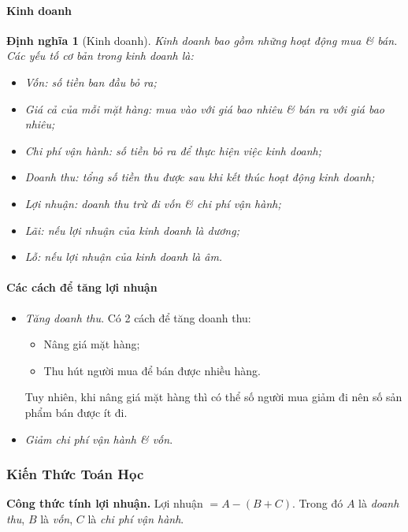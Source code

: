 \documentclass{article}
\numberwithin{equation}{section}
\newtheorem{dinhnghia}{Định nghĩa}[section]
\begin{document}
\paragraph{Kinh doanh}
\begin{dinhnghia}[Kinh doanh]
	\emph{Kinh doanh} bao gồm những hoạt động mua \textit{\&} bán. Các yếu tố cơ bản trong kinh doanh là:
	\begin{itemize}
		\item \emph{Vốn:} số tiền ban đầu bỏ ra;
		\item \emph{Giá cả của mỗi mặt hàng:} mua vào với giá bao nhiêu \textit{\&} bán ra với giá bao nhiêu;
		\item \emph{Chi phí vận hành:} số tiền bỏ ra để thực hiện việc kinh doanh;
		\item \emph{Doanh thu:} tổng số tiền thu được sau khi kết thúc hoạt động kinh doanh;
		\item \emph{Lợi nhuận:} doanh thu trừ đi vốn \textit{\&} chi phí vận hành;
		\item \emph{Lãi:} nếu lợi nhuận của kinh doanh là dương;
		\item \emph{Lỗ:} nếu lợi nhuận của kinh doanh là âm.
	\end{itemize}
\end{dinhnghia}

\paragraph{Các cách để tăng lợi nhuận}
\begin{itemize}
	\item \textit{Tăng doanh thu}. Có 2 cách để tăng doanh thu:
	\begin{itemize}
		\item Nâng giá mặt hàng;
		\item Thu hút người mua để bán được nhiều hàng.
	\end{itemize}
	Tuy nhiên, khi nâng giá mặt hàng thì có thể số người mua giảm đi nên số sản phẩm bán được ít đi.
	\item \textit{Giảm chi phí vận hành \textit{\&} vốn}.
\end{itemize}

\subsubsection{Kiến Thức Toán Học}

\begin{tcolorbox}
	\textbf{Công thức tính lợi nhuận.} Lợi nhuận $= A - (B + C)$. Trong đó $A$ là \textit{doanh thu}, $B$ là \textit{vốn}, $C$ là \textit{chi phí vận hành}.
\end{tcolorbox}
\end{document}
